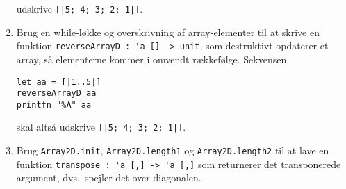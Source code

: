 \documentclass[a4paper,12pt]{article}
\begin{document}
\begin{enumerate}[label=5ø.\arabic*,start=0]
    udskrive \mbox{\lstinline{[|5; 4; 3; 2; 1|]}}.
  \item Brug en while-løkke og overskrivning af array-elementer til at skrive en funktion \lstinline{reverseArrayD : 'a [] -> unit}, som destruktivt opdaterer et array, så elementerne kommer i omvendt rækkefølge.  Sekvensen
\begin{verbatim}
let aa = [|1..5|]
reverseArrayD aa
printfn "%A" aa
\end{verbatim}
skal altså udskrive \lstinline{[|5; 4; 3; 2; 1|]}.
\item Brug \lstinline{Array2D.init}, \lstinline{Array2D.length1} og \lstinline{Array2D.length2} til at lave en funktion \lstinline{transpose : 'a [,] -> 'a [,]} som returnerer det transponerede argument, dvs.\ spejler det over diagonalen.
\end{enumerate}
\end{document}
